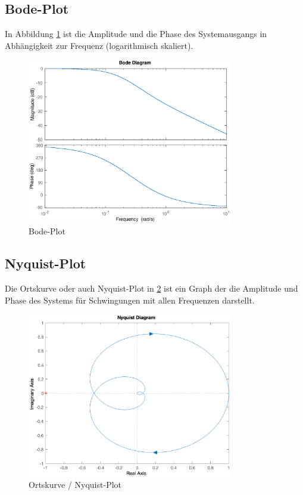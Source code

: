 \subsection{Bode-Plot}

In Abbildung \ref{fig:bode} ist die Amplitude und die Phase des Systemausgangs in Abhängigkeit zur Frequenz (logarithmisch skaliert).

\begin{figure}[H]
    \label{fig:bode}
    \centering
    \includegraphics[width=0.8\textwidth]{Bilder/Bode.eps}
    \caption{Bode-Plot}
 \end{figure}

\subsection{Nyquist-Plot}

Die Ortskurve oder auch Nyquist-Plot in \ref{fig:nyquist} ist ein Graph der die Amplitude und Phase des Systems für Schwingungen mit allen Frequenzen darstellt.

\begin{figure}[H]
    \label{fig:nyquist}
    \centering
    \includegraphics[width=0.8\textwidth]{Bilder/Nyquist.eps}
    \caption{Ortskurve / Nyquist-Plot}
 \end{figure}